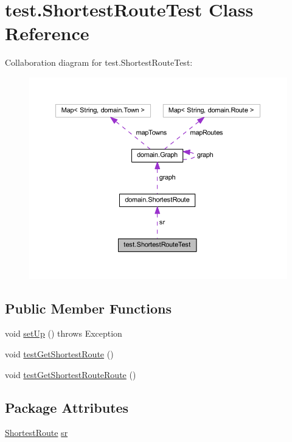 \hypertarget{classtest_1_1_shortest_route_test}{}\section{test.\+Shortest\+Route\+Test Class Reference}
\label{classtest_1_1_shortest_route_test}


Collaboration diagram for test.\+Shortest\+Route\+Test\+:\nopagebreak
\begin{figure}[H]
\begin{center}
\leavevmode
\includegraphics[width=350pt]{classtest_1_1_shortest_route_test__coll__graph}
\end{center}
\end{figure}
\subsection*{Public Member Functions}
\begin{DoxyCompactItemize}
\item 
void \hyperlink{classtest_1_1_shortest_route_test_a26c468579bbd635c5a0e5f0be7852562}{set\+Up} ()  throws Exception 
\item 
void \hyperlink{classtest_1_1_shortest_route_test_a2471bd1b489d85e9430575247c9b2231}{test\+Get\+Shortest\+Route} ()
\item 
void \hyperlink{classtest_1_1_shortest_route_test_af62280c4503b597b7f9a5ed11b163677}{test\+Get\+Shortest\+Route\+Route} ()
\end{DoxyCompactItemize}
\subsection*{Package Attributes}
\begin{DoxyCompactItemize}
\item 
\hyperlink{classdomain_1_1_shortest_route}{Shortest\+Route} \hyperlink{classtest_1_1_shortest_route_test_af8d3f3424aff469b335ca4a4f67517c1}{sr}
\end{DoxyCompactItemize}


